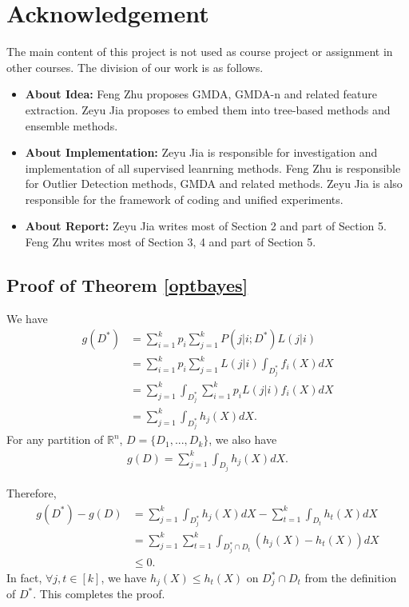 \documentclass[english]{article}
\newenvironment{eqt}{\begin{equation}\begin{aligned}}{\end{aligned}\end{equation}}
\begin{document}
\section*{Acknowledgement}
\par The main content of this project is not used as course project or assignment in other courses. The division of our work is as follows. 
\begin{itemize}
\item \textbf{About Idea:} Feng Zhu proposes GMDA, GMDA-n and related feature extraction. Zeyu Jia proposes to embed them into tree-based methods and ensemble methods. 
\item \textbf{About Implementation:} Zeyu Jia is responsible for investigation and implementation of all supervised leanrning methods. Feng Zhu is responsible for Outlier Detection methods, GMDA and related methods. Zeyu Jia is also responsible for the framework of coding and unified experiments.
\item \textbf{About Report:} Zeyu Jia writes most of Section 2 and part of Section 5. Feng Zhu writes most of Section 3, 4 and part of Section 5.
\end{itemize}




\begin{appendix}
\section{Proof of Theorem \ref{optbayes}}
\par

We have
\begin{eqt}
g(D^*) & = \sum_{i=1}^kp_i\sum_{j=1}^kP(j|i;D^*)L(j|i) \\
& = \sum_{i=1}^kp_i\sum_{j=1}^kL(j|i)\int_{D_j^*}f_i(X)dX \\
& = \sum_{j=1}^k\int_{D_j^*}\sum_{i=1}^kp_iL(j|i)f_i(X)dX \\
& = \sum_{j=1}^k\int_{D_j^*}h_j(X)dX.
\end{eqt}
For any partition of $\mathbb{R}^n$, $D = \{D_1, ..., D_k\}$, we also have
\begin{eqt}
g(D) = \sum_{j=1}^k\int_{D_j}h_j(X)dX.
\end{eqt}

Therefore, 
\begin{eqt}
g(D^*) - g(D) & = \sum_{j=1}^k\int_{D_j^*}h_j(X)dX - \sum_{t=1}^k\int_{D_t}h_t(X)dX \\
& = \sum_{j=1}^k\sum_{t=1}^k\int_{D_j^*\cap D_t}\left(h_j(X)-h_t(X)\right)dX \\
& \leqslant 0.
\end{eqt}
In fact, $\forall j, t\in[k]$, we have $h_j(X)\leqslant h_t(X)$ on $D_j^*\cap D_t$ from the definition of $D^*$. This completes the proof.
\end{appendix}
\end{document}
